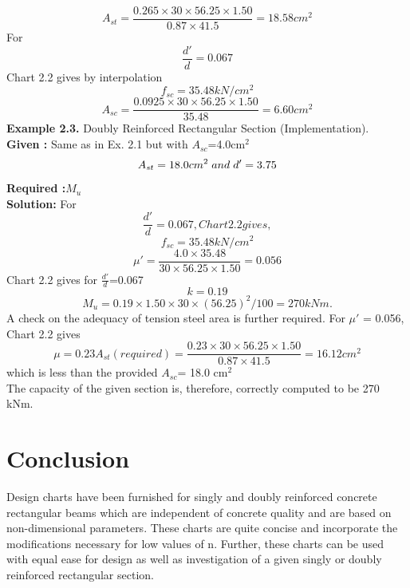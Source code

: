\begin{equation*}
A_{st}=\frac{0.265 \times 30\times 56.25 \times 1.50}{0.87 \times 41.5}=18.58cm^2
\end{equation*}
For
\begin{equation*}
\frac{d'}{d}=0.067
\end{equation*}
Chart 2.2 gives by interpolation
\begin{equation*}
f_{sc}=35.48kN/cm^2
\end{equation*}
\begin{equation*}
A_{sc}=\frac{0.0925 \times 30 \times 56.25 \times 1.50}{35.48}=6.60cm^2
\end{equation*}
\textbf{Example 2.3.} Doubly Reinforced Rectangular Section (Implementation).\\
\textbf{Given :}  Same as in Ex. 2.1 but with ${A_{sc}}$=4.0cm$^{2}$
\begin{equation*}
A_{st}=18.0cm^2 \hspace{0.1cm}and\hspace{0.1cm} d'=3.75
\end{equation*}
\textbf{Required :}${M_{u}}$\\
\textbf{Solution:} For
\begin{equation*}
\frac{d'}{d}=0.067,Chart 2.2 gives,
\end{equation*}
\begin{equation*}
f_{sc}=35.48kN/cm^2
\end{equation*}
\begin{equation*}
\mu'=\frac{4.0 \times 35.48}{30 \times 56.25 \times 1.50}=0.056
\end{equation*}
Chart 2.2 gives for $\frac{d'}{d}$=0.067
\begin{equation*}
k=0.19
\end{equation*}
\begin{equation*}
M_u= 0.19 \times 1.50 \times 30 \times (56.25)^2/100=270kNm. 
\end{equation*}
A check on the adequacy of tension steel area is further required. For $\mu'$ = 0.056, Chart 2.2
gives
\begin{equation*}
\mu=0.23
A_{st}(required)=\frac{0.23 \times 30 \times 56.25 \times 1.50}{0.87 \times 41.5}=16.12cm^2
\end{equation*}
which is less than the provided ${A_{sc}}$= 18.0 cm$^{2}$\\
The capacity of the given section is, therefore, correctly computed to be 270 kNm.
\newpage
\section{Conclusion}
Design charts have been furnished for singly and doubly reinforced concrete rectangular
beams which are independent of concrete quality and are based on non-dimensional
parameters. These charts are quite concise and incorporate the modiﬁcations necessary for
low values of n. Further, these charts can be used with equal ease for design as well as
investigation of a given singly or doubly reinforced rectangular section.






